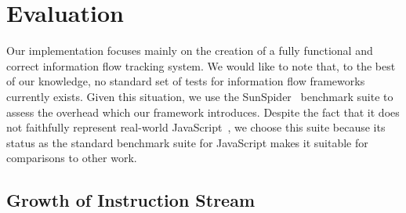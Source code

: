 \documentclass[preprint]{sigplanconf}
\begin{document}


\section{Evaluation}
\label{sec:evaluation}

%

Our implementation focuses mainly on the creation of a fully functional and correct information flow tracking system.
We would like to note that, to the best of our knowledge, no standard set of tests for information flow frameworks currently exists.
Given this situation, we use the SunSpider~\cite{sunspider} benchmark suite to assess the overhead which our framework introduces.
Despite the fact that it does not faithfully represent real-world JavaScript~\cite{jsmeter}, we choose this suite because its status as the standard benchmark suite for JavaScript makes it suitable for comparisons to other work.

\subsection{Growth of Instruction Stream}

\end{document}
